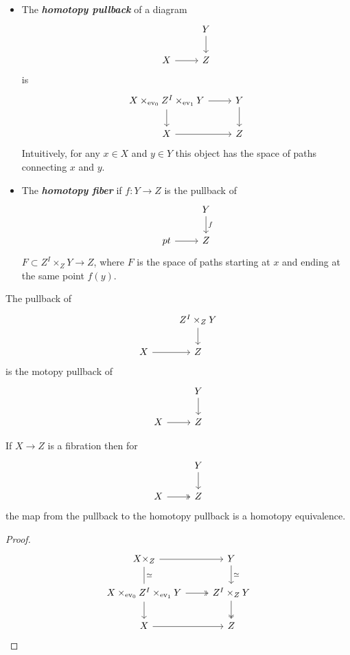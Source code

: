 \documentclass{article}
\numberwithin{equation}{section}
\DeclareMathOperator{\ev}{ev}
\begin{document}
\begin{defn}\leavevmode
	\begin{itemize}
		\item The \textbf{\textit{homotopy pullback}} of a diagram
		\[\begin{tikzcd}
			&Y\arrow[d]\\
			X\arrow[r]&Z
		\end{tikzcd}\]
		is
		\[\begin{tikzcd}
			X\times_{\ev_0}Z^I\times_{\ev_1}Y\arrow[d]\arrow[r]&Y\arrow[d]\\
			X\arrow[r]&Z
		\end{tikzcd}\]
		Intuitively, for any $x\in X$ and $y\in Y$ this object has the space of paths connecting $x$ and $y$.
		
		\item The \textbf{\textit{homotopy fiber}} if $f:Y\to Z$ is the pullback of
		\[\begin{tikzcd}
			&Y\arrow[d,"f"]\\
			pt\arrow[r]&Z
		\end{tikzcd}\]
		$F\subset Z^I\times_ZY\to Z$, where $F$ is the space of paths starting at $x$ and ending at the same point $f(y)$.
	\end{itemize}
\end{defn}
\begin{remark}
	The pullback of
	\[\begin{tikzcd}
		&Z^I\times_ZY\arrow[d]\\
		X\arrow[r]&Z
	\end{tikzcd}\]
	is the motopy pullback of
	\[\begin{tikzcd}
		&Y\arrow[d]\\
		X\arrow[r]&Z
	\end{tikzcd}\]
\end{remark}
\begin{lemma}
	If $X\to Z$ is a fibration then for
	\[\begin{tikzcd}
		&Y\arrow[d]\\
		X\arrow[r,two heads]&Z
	\end{tikzcd}\]
	the map from the pullback to the homotopy pullback is a homotopy equivalence.
\end{lemma}
\begin{proof}
	\[\begin{tikzcd}
		X\times_Z\arrow[r]\arrow[d,"\simeq",dash]&Y\arrow[d,"\simeq"]\\
		X\times_{\ev_0}Z^I\times_{\ev_1}Y\arrow[r,two heads]\arrow[d]&Z^I\times_ZY\arrow[d,two heads]\\
		X\arrow[r]&Z
	\end{tikzcd}\]
\end{proof}
\end{document}
